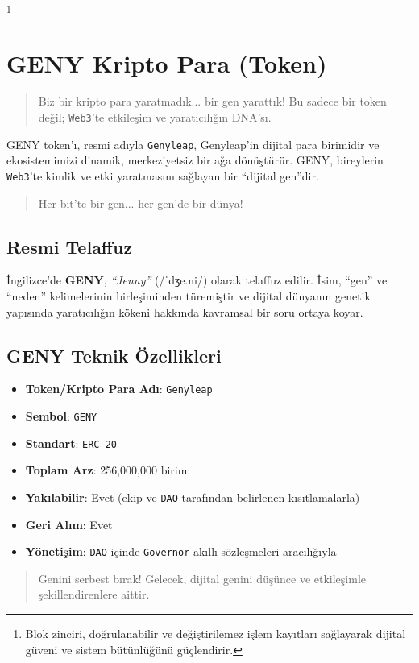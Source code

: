 \documentclass[a4paper,12pt,openany]{book}
\begin{document}
\footnote{Blok zinciri, doğrulanabilir ve değiştirilemez işlem kayıtları sağlayarak dijital güveni ve sistem bütünlüğünü güçlendirir.}

\chapter{GENY Kripto Para (Token)}
\begin{quote}
Biz bir kripto para yaratmadık... bir gen yarattık! Bu sadece bir token değil; \texttt{Web3}'te etkileşim ve yaratıcılığın DNA'sı.
\end{quote}
GENY token’ı, resmi adıyla \texttt{Genyleap}, Genyleap’in dijital para birimidir ve ekosistemimizi dinamik, merkeziyetsiz bir ağa dönüştürür. GENY, bireylerin \texttt{Web3}'te kimlik ve etki yaratmasını sağlayan bir “dijital gen”dir.
\begin{quote}
Her bit’te bir gen... her gen’de bir dünya!
\end{quote}

\section*{Resmi Telaffuz}
İngilizce’de \textbf{GENY}, \textit{``Jenny''} ({\ipafont /ˈdʒe.ni/}) olarak telaffuz edilir. İsim, “gen” ve “neden” kelimelerinin birleşiminden türemiştir ve dijital dünyanın genetik yapısında yaratıcılığın kökeni hakkında kavramsal bir soru ortaya koyar.

\section*{GENY Teknik Özellikleri}
\begin{itemize}
    \item \textbf{Token/Kripto Para Adı}: \texttt{Genyleap}
    \item \textbf{Sembol}: \texttt{GENY}
    \item \textbf{Standart}: \texttt{ERC-20}
    \item \textbf{Toplam Arz}: 256,000,000 birim
    \item \textbf{Yakılabilir}: Evet (ekip ve \texttt{DAO} tarafından belirlenen kısıtlamalarla)
    \item \textbf{Geri Alım}: Evet
    \item \textbf{Yönetişim}: \texttt{DAO} içinde \texttt{Governor} akıllı sözleşmeleri aracılığıyla
\end{itemize}
\vspace{-0.5em}
\begin{quote}
Genini serbest bırak! Gelecek, dijital genini düşünce ve etkileşimle şekillendirenlere aittir.
\end{quote}
\newpage
\end{document}
